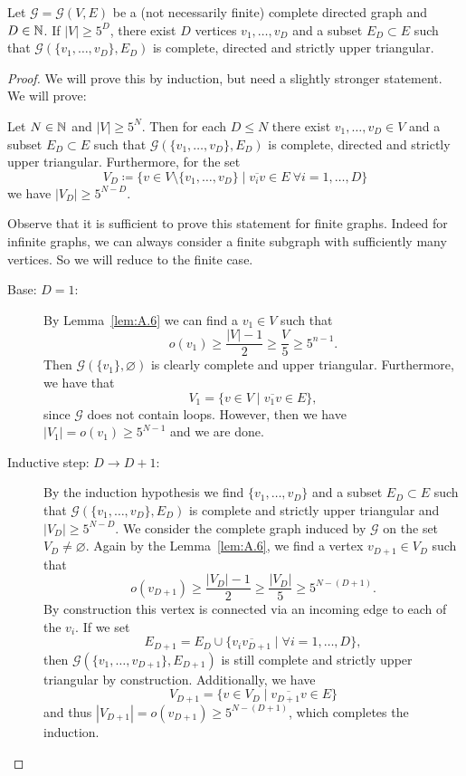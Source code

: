 \begin{lemma}[{\cite[Lemma~A.8]{MR3509968}}]
  \label{lem:A.8}
  Let \(\mathcal{G} = \mathcal{G}(V,E)\) be a (not necessarily finite) complete directed graph and \(D \in \mathbb{N}\). If \(|V| \geq 5^D\), there exist \(D\) vertices \(v_1, \dots, v_D\) and a subset \(E_D \subset E\) such that \(\mathcal{G}(\{v_1, \dots, v_D\}, E_D)\) is complete, directed and strictly upper triangular.
\end{lemma}

\begin{proof}
  We will prove this by induction, but need a slightly stronger statement. We will prove:

  Let \(N \in \mathbb{N}\) and \(|V| \geq 5^N\). Then for each \(D \leq N\) there exist \(v_1,\dots, v_D \in V\) and a subset \(E_D \subset E\) such that \(\mathcal{G}(\{v_1, \dots, v_D\}, E_D)\) is complete, directed and strictly upper triangular. Furthermore, for the set
  \[
    V_D \coloneqq \{v \in V \setminus \{v_1, \dots, v_D\} \mid \overline{v_iv} \in E\ \forall i =1,\dots, D\}
  \]
  we have \(|V_D| \geq 5^{N-D}\).

  Observe that it is sufficient to prove this statement for finite graphs. Indeed for infinite graphs, we can always consider a finite subgraph with sufficiently many vertices. So we will reduce to the finite case.
  \begin{description}
  \item[Base: \(D = 1\):] By Lemma~\ref{lem:A.6} we can find a \(v_1 \in V\) such that
    \[
      o(v_1) \geq \frac{|V| - 1}{2} \geq \frac{V}{5} \geq 5^{n-1}.
    \]
    Then \(\mathcal{G}(\{v_1\}, \varnothing)\) is clearly complete and upper triangular. Furthermore, we have that
    \[
      V_1 = \{v \in V \mid \overline{v_1v} \in E\},
    \]
    since \(\mathcal{G}\) does not contain loops. However, then we have \(|V_1| = o(v_1) \geq 5^{N-1}\) and we are done.
  \item[Inductive step: \(D \to D+1\):] By the induction hypothesis we find \(\{v_1, \dots, v_D\}\) and a subset \(E_D \subset E\) such that \(\mathcal{G}(\{v_1, \dots, v_D\}, E_D)\) is complete and strictly upper triangular and \(|V_D| \geq 5^{N-D}\). We consider the complete graph induced by \(\mathcal{G}\) on the set \(V_D \neq \varnothing\). Again by the Lemma~\ref{lem:A.6}, we find a vertex \(v_{D+1} \in V_D\) such that
    \[
      o(v_{D+1}) \geq \frac{|V_D| -1}{2} \geq \frac{|V_D|}{5} \geq 5^{N - (D+1)}.
    \]
    By construction this vertex is connected via an incoming edge to each of the \(v_i\). If we set
    \[
      E_{D+1} = E_D \cup \{\overline{v_iv_{D+1}} \mid \forall i = 1, \dots, D\},
    \]
    then \(\mathcal{G}(\{v_1, \dots, v_{D+1}\}, E_{D+1})\) is still complete and strictly upper triangular by construction. Additionally, we have
    \[
      V_{D+1} = \{v \in V_D \mid \overline{v_{D+1}v} \in E\}
    \]
    and thus \(|V_{D+1}| = o(v_{D+1}) \geq 5^{N- (D+1)}\), which completes the induction.
  \end{description}
\end{proof}

